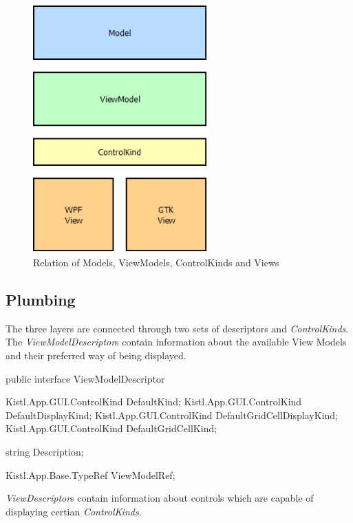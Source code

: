 \begin{figure}[ht]
	\begin{center}
		\includegraphics[width=0.6\textwidth]{images/GUI_Relation_MVVM.png}
		\caption{Relation of Models, ViewModels, ControlKinds and Views}
		\label{GUI_Relation_MVVM}
	\end{center}
\end{figure}

\subsection{Plumbing}

The three layers are connected through two sets of descriptors and \emph{ControlKinds}. The
\emph{ViewModelDescriptor}s contain information about the
available View Models and their preferred way of being displayed. 

\begin{CS}
public interface ViewModelDescriptor
{
	Kistl.App.GUI.ControlKind DefaultKind;
	Kistl.App.GUI.ControlKind DefaultDisplayKind;
	Kistl.App.GUI.ControlKind DefaultGridCellDisplayKind;
	Kistl.App.GUI.ControlKind DefaultGridCellKind;
	
	string Description;
	
	Kistl.App.Base.TypeRef ViewModelRef;
}
\end{CS}

\emph{ViewDescriptor}s contain information about controls which are capable of displaying certian \emph{ControlKinds}.


